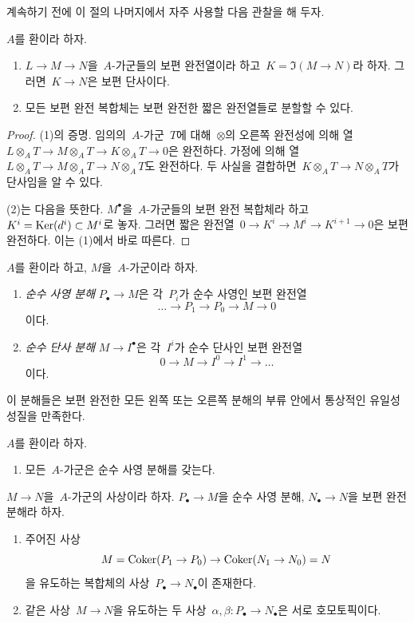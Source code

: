 \noindent
계속하기 전에 이 절의 나머지에서 자주 사용할 다음 관찰을 해 두자.

\begin{lemma}
\label{lemma-split-universally-exact-sequence}
$A$를 환이라 하자.
\begin{enumerate}
\item $L \to M \to N$을\  $A$-가군들의 보편 완전열이라 하고\ 
$K = \Im(M \to N)$라 하자. 그러면\  $K \to N$은 보편 단사이다.
\item 모든 보편 완전 복합체는 보편 완전한 짧은 완전열들로
분할할 수 있다.
\end{enumerate}
\end{lemma}

\begin{proof}
(1)의 증명. 임의의\  $A$-가군\  $T$에 대해\  $\otimes$의 오른쪽
완전성에 의해 열\ 
$L \otimes_A T \to M \otimes_A T \to K \otimes_A T \to 0$은
완전하다. 가정에 의해 열\ 
$L \otimes_A T \to M \otimes_A T \to N \otimes_A T$도 완전하다.
두 사실을 결합하면\  $K \otimes_A T \to N \otimes_A T$가 단사임을
알 수 있다.

\medskip\noindent
(2)는 다음을 뜻한다. $M^\bullet$을\  $A$-가군들의 보편 완전 복합체라
하고\  $K^i = \mathop{\mathrm{Ker}}(d^i) \subset M^i$로 놓자. 그러면 짧은 완전열\ 
$0 \to K^i \to M^i \to K^{i + 1} \to 0$은 보편 완전하다.
이는 (1)에서 바로 따른다.
\end{proof}

\begin{definition}
\label{definition-pure-resolution}
$A$를 환이라 하고, $M$을\  $A$-가군이라 하자.
\begin{enumerate}
\item {\it 순수 사영 분해} $P_\bullet \to M$은 각\  $P_i$가
순수 사영인 보편 완전열
$$
\ldots \to P_1 \to P_0 \to M \to 0
$$
이다.
\item {\it 순수 단사 분해} $M \to I^\bullet$은 각\  $I^i$가
순수 단사인 보편 완전열
$$
0 \to M \to I^0 \to I^1 \to \ldots
$$
이다.
\end{enumerate}
\end{definition}

\noindent
이 분해들은 보편 완전한 모든 왼쪽 또는 오른쪽 분해의 부류 안에서
통상적인 유일성 성질을 만족한다.

\begin{lemma}
\label{lemma-pure-projective-resolutions}
$A$를 환이라 하자.
\begin{enumerate}
\item 모든\  $A$-가군은 순수 사영 분해를 갖는다.
\end{enumerate}
$M \to N$을\  $A$-가군의 사상이라 하자. $P_\bullet \to M$을
순수 사영 분해, $N_\bullet \to N$을 보편 완전 분해라 하자.
\begin{enumerate}
\item[(2)] 주어진 사상
$$
M = \mathop{\mathrm{Coker}}(P_1 \to P_0) \to \mathop{\mathrm{Coker}}(N_1 \to N_0) = N
$$
을 유도하는 복합체의 사상\  $P_\bullet \to N_\bullet$이 존재한다.
\item[(3)] 같은 사상\  $M \to N$을 유도하는 두 사상\ 
$\alpha, \beta : P_\bullet \to N_\bullet$은 서로 호모토픽이다.
\end{enumerate}
\end{lemma}

